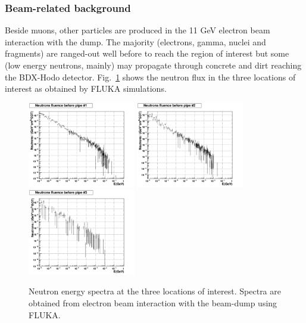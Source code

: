 \subsubsection{Beam-related background}
Beside muons, other particles are produced in the 11 GeV electron beam interaction with the dump.
The majority (electrons, gamma, nuclei and fragments) are ranged-out well before to reach the region of interest but some (low energy neutrons, mainly) may propagate through  concrete and  dirt reaching the BDX-Hodo detector.
Fig.~\ref{fig:nu-comp} shows the neutron flux  in the  three locations of interest as obtained by  FLUKA simulations. 
\begin{figure}[h!] 
\center
\includegraphics[width=4.7cm]{figs/NeutronsPipe1_1D.pdf}
\includegraphics[width=4.7cm]{figs/NeutronsPipe2_1D.pdf}
\includegraphics[width=4.7cm]{figs/NeutronsPipe3_1D.pdf}
\caption {Neutron energy spectra at the three locations of interest. Spectra are obtained from electron beam interaction with the beam-dump using FLUKA.}
\label{fig:nu-comp}
\end{figure}


